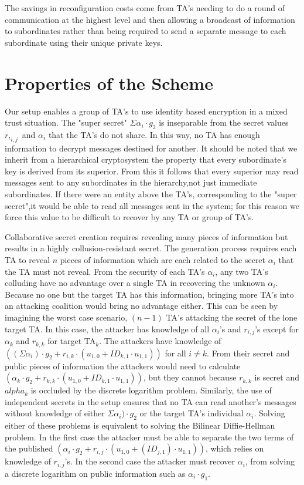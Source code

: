 \documentclass[10pt]{article}
\begin{document}
The savings in reconfiguration costs come from TA’s needing to do a round of communication at the highest level and then allowing a broadcast of information to subordinates rather than being required to send a separate message to each subordinate using their unique private keys.

\section*{Properties of the Scheme}

Our setup enables a group of TA's to use identity based encryption in a mixed trust situation. The "super secret" $\Sigma \alpha_i \cdot g_2$ is inseparable from the secret values $r,_{i,j}$ and $\alpha_i$ that the TA's do not share. In this way, no TA has enough information to decrypt messages destined for another.  It should be noted that we inherit from a hierarchical cryptosystem the property that every subordinate's key is derived from its superior. From this  it follows that every superior may read messages sent to any subordinates in the hierarchy,not just immediate subordinates.  If there were an entity above the TA's, corresponding to the "super secret",it would be able to read all messages sent in the system; for this reason we force this value to be difficult to recover by any TA or group of TA's.

Collaborative secret creation requires revealing many pieces of information but results in a highly collusion-resistant secret. The generation process requires each TA to reveal $n$ pieces of information which are each related to the secret $\alpha_i$ that the TA must not reveal. From the security of each TA’s $\alpha_i$, any two TA’s colluding have no advantage over a single TA in recovering the unknown $\alpha_i$. Because no one but the target TA has this information, bringing more TA’s into an attacking coalition would bring no advantage either. This can be seen by imagining the worst case scenario, $(n-1)$ TA’s attacking the secret of the lone target TA. In this case, the attacker has knowledge of all $\alpha_i$’s and $r_{i,j}$’s except for $\alpha_k$ and $r_{k,k}$ for target TA$_k$. The attackers have knowledge of $((\Sigma \alpha_i)\cdot g_2+ r_{i,k} \cdot (u_{1,0} + ID_{k,1}\cdot u_{1,1}))$ for all $i \neq k$. From their secret and public pieces of information  the attackers would need to calculate $(\alpha_k \cdot g_2 + r_{k,k} \cdot ( u_{1,0} +ID_{k,1} \cdot u_{1,1}))$, but they cannot because $r_{k,k}$ is secret and $alpha_k$ is occluded by the discrete logarithm problem.
Similarly, the use of independent secrets in the setup ensures that no TA can read another’s messages without knowledge of either $\Sigma \alpha_i)\cdot g_2$ or the target TA’s individual $\alpha_i$. Solving either of these problems is equivalent to solving the Bilinear Diffie-Hellman problem. In the first case the attacker must be able to separate the two terms of the published $(\alpha_i \cdot g_2 + r_{i,j} \cdot (u_{1,0} + (ID_{j,1})\cdot u_{1,1}))$, which relies on knowledge of $r_{i,j}$’s. In the second case the attacker must recover $\alpha_i$, from solving a discrete logarithm on public information such as $\alpha_i \cdot g_1$.
\end{document}

